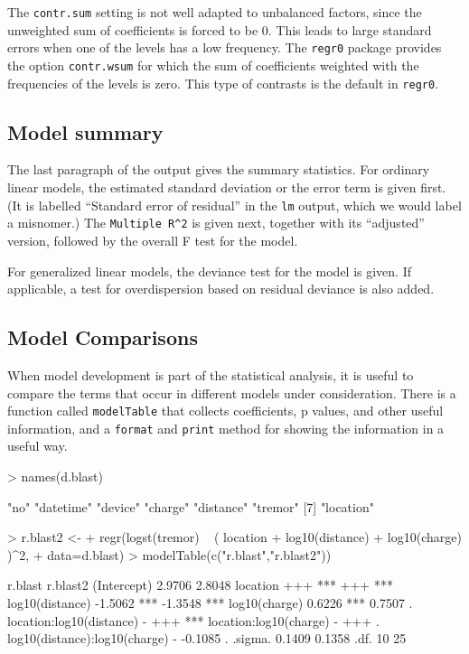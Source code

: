 \documentclass[11pt]{article}
\providecommand{\T}{\texttt}
\begin{document}
The \T{contr.sum} setting is not well adapted to unbalanced factors, since
the unweighted sum of coefficients is forced to be 0.
This leads to large standard errors when one of the levels has a low 
frequency. 
The \T{regr0} package provides the option \T{contr.wsum} for which the
sum of coefficients weighted with the frequencies of the levels is zero.
This type of contrasts is the default in \T{regr0}.

\subsection{Model summary}
The last paragraph of the output gives the summary statistics.
For ordinary linear models, the estimated standard deviation or the error
term is given first. (It is labelled ``Standard error of residual'' in the 
\T{lm} output, which we would label a misnomer.)
The \T{Multiple R\^{}2} is given next, together with its ``adjusted''
version, followed by the overall F test for the model.

For generalized linear models, the deviance test for the model is given.
If applicable, a test for overdispersion based on residual deviance is also
added. 

\subsection{Model Comparisons}
When model development is part of the statistical analysis, it is useful to
compare the terms that occur in different models under consideration.
There is a function called \T{modelTable} that collects coefficients, 
p values, and other useful information, and a \T{format} and \T{print} 
method for showing the information in a useful way.

\begin{Schunk}
\begin{Sinput}
> names(d.blast)
\end{Sinput}
\begin{Soutput}
[1] "no"       "datetime" "device"   "charge"   "distance" "tremor"  
[7] "location"
\end{Soutput}
\begin{Sinput}
> r.blast2 <- 
+   regr(logst(tremor) ~ ( location + log10(distance) + log10(charge) )^2,
+        data=d.blast)
> modelTable(c("r.blast","r.blast2"))             
\end{Sinput}
\begin{Soutput}
                               r.blast       r.blast2    
(Intercept)                     2.9706        2.8048     
location                          +++   ***     +++   ***
log10(distance)                -1.5062  ***  -1.3548  ***
log10(charge)                   0.6226  ***   0.7507  .  
location:log10(distance)           -            +++   ***
location:log10(charge)             -            +++   .  
log10(distance):log10(charge)      -         -0.1085  .  
.sigma.                         0.1409        0.1358     
.df.                              10            25       
\end{Soutput}
\end{Schunk}
\end{document}
